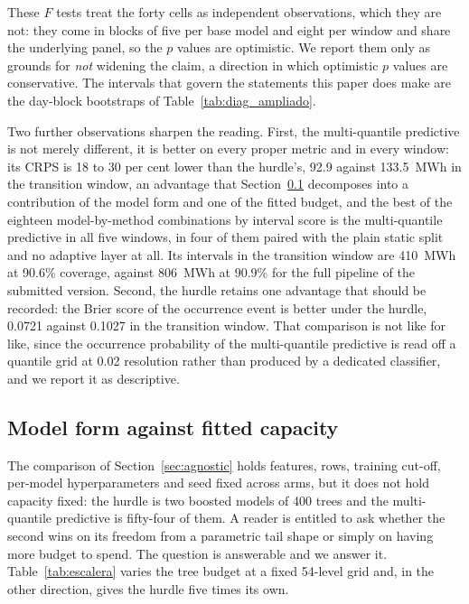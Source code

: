 \documentclass[preprint,3p,times]{elsarticle}
\begin{document}
These $F$ tests treat the forty cells as independent observations, which they are not: they come in blocks of five per base model and eight per window and share the underlying panel, so the $p$ values are optimistic. We report them only as grounds for \emph{not} widening the claim, a direction in which optimistic $p$ values are conservative. The intervals that govern the statements this paper does make are the day-block bootstraps of Table~\ref{tab:diag_ampliado}.

Two further observations sharpen the reading. First, the multi-quantile predictive is not merely different, it is better on every proper metric and in every window: its CRPS is 18 to 30 per cent lower than the hurdle's, 92.9 against 133.5~MWh in the transition window, an advantage that Section~\ref{sec:escalera} decomposes into a contribution of the model form and one of the fitted budget, and the best of the eighteen model-by-method combinations by interval score is the multi-quantile predictive in all five windows, in four of them paired with the plain static split and no adaptive layer at all. Its intervals in the transition window are 410~MWh at 90.6\% coverage, against 806~MWh at 90.9\% for the full pipeline of the submitted version. Second, the hurdle retains one advantage that should be recorded: the Brier score of the occurrence event is better under the hurdle, 0.0721 against 0.1027 in the transition window. That comparison is not like for like, since the occurrence probability of the multi-quantile predictive is read off a quantile grid at 0.02 resolution rather than produced by a dedicated classifier, and we report it as descriptive.

\subsection{Model form against fitted capacity}
\label{sec:escalera}

The comparison of Section~\ref{sec:agnostic} holds features, rows, training cut-off, per-model hyperparameters and seed fixed across arms, but it does not hold capacity fixed: the hurdle is two boosted models of 400 trees and the multi-quantile predictive is fifty-four of them. A reader is entitled to ask whether the second wins on its freedom from a parametric tail shape or simply on having more budget to spend. The question is answerable and we answer it. Table~\ref{tab:escalera} varies the tree budget at a fixed 54-level grid and, in the other direction, gives the hurdle five times its own.
\end{document}
